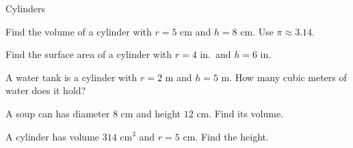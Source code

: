 \begin{practiceBox}{Cylinders}
\resetProblems

\prob Find the volume of a cylinder with $r = 5$ cm and $h = 8$ cm. Use $\pi \approx 3.14$.

\prob Find the surface area of a cylinder with $r = 4$ in.\ and $h = 6$ in.

\prob A water tank is a cylinder with $r = 2$ m and $h = 5$ m. How many cubic meters of water does it hold?

\prob A soup can has diameter $8$ cm and height $12$ cm. Find its volume.

\prob A cylinder has volume $314$ cm$^3$ and $r = 5$ cm. Find the height.

\end{practiceBox}
